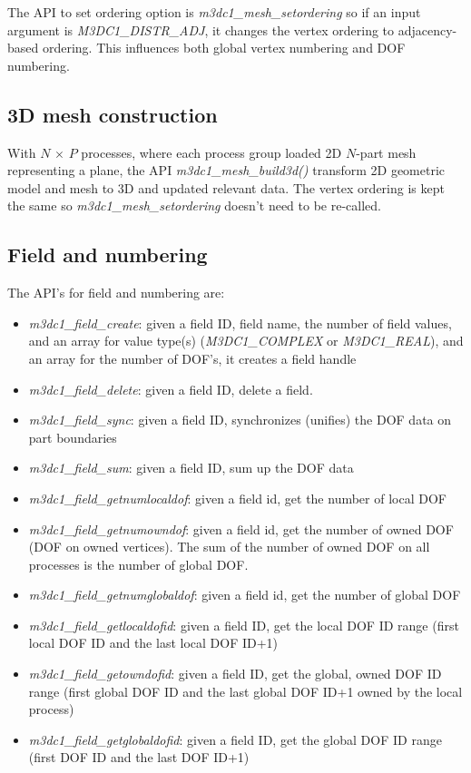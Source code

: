 \documentclass[11pt]{article}  %
\begin{document}
The API to set ordering option is \emph{m3dc1\_mesh\_setordering} so if an input argument is \emph{M3DC1\_DISTR\_ADJ}, it changes the vertex ordering to adjacency-based ordering. This influences both global vertex numbering and DOF numbering.

\subsection{3D mesh construction}\label{sec:step3}
With $N$ $\times$ $P$ processes, where each process group loaded 2D $N$-part mesh representing a plane, the API \emph{m3dc1\_mesh\_build3d()} transform 2D geometric model and mesh to 3D and updated relevant data. The vertex ordering is kept the same so \emph{m3dc1\_mesh\_setordering} doesn't need to be re-called. 

\subsection{Field and numbering}\label{sec:step4}

The API's for field and numbering are:
\begin{itemize}
\item \emph{m3dc1\_field\_create}: given a field ID, field name, the number of field values, and an array for value type(s) (\emph{M3DC1\_COMPLEX} or \emph{M3DC1\_REAL}), and an array for the number of DOF's, it creates a field handle
\item \emph{m3dc1\_field\_delete}: given a field ID, delete a field.
\item \emph{m3dc1\_field\_sync}: given a field ID, synchronizes (unifies) the DOF data on part boundaries
\item \emph{m3dc1\_field\_sum}: given a field ID, sum up the DOF data 
\item \emph{m3dc1\_field\_getnumlocaldof}: given a field id, get the number of local DOF
\item \emph{m3dc1\_field\_getnumowndof}: given a field id, get the number of owned DOF (DOF on owned vertices). The sum of the number of owned DOF on all processes is the number of global DOF.
\item \emph{m3dc1\_field\_getnumglobaldof}: given a field id, get the number of global DOF
\item \emph{m3dc1\_field\_getlocaldofid}: given a field ID, get the local DOF ID range (first local DOF ID and the last local DOF ID+1)
\item \emph{m3dc1\_field\_getowndofid}: given a field ID, get the global, owned DOF ID range (first global DOF ID and the last global DOF ID+1 owned by the local process)
\item \emph{m3dc1\_field\_getglobaldofid}: given a field ID, get the global DOF ID range (first DOF ID and the last DOF ID+1)
\end{itemize}
\end{document}
